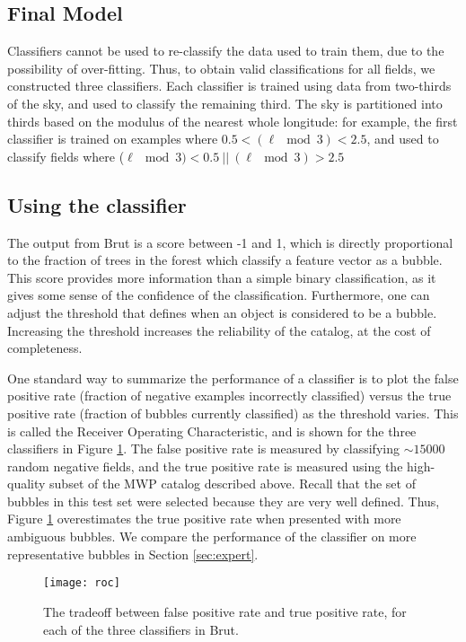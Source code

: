 \documentclass[preprint]{aastex}
\begin{document}
\subsection{Final Model}

Classifiers cannot be used to re-classify the data used to train them, due to the possibility of over-fitting. Thus, to obtain valid classifications for all fields, we constructed three classifiers. Each classifier is trained using data from two-thirds of the sky, and used to classify the remaining third. The sky is partitioned into thirds based on the modulus of the nearest whole longitude: for example, the first classifier is trained on examples where $0.5 < (\ell \mod{3})  < 2.5$, and used to classify fields where ($\ell \mod{3}) < 0.5 ~ || ~(\ell \mod{3}) > 2.5 $

\subsection{Using the classifier}

The output from Brut is a score between -1 and 1, which is directly proportional to the fraction of trees in the forest which classify a feature vector as a bubble. This score provides more information than a simple binary classification, as it gives some sense of the confidence of the classification. Furthermore, one can adjust the threshold that defines when an object is considered to be a bubble. Increasing the threshold increases the reliability of the catalog, at the cost of completeness.

One standard way to summarize the performance of a classifier is to plot the false positive rate (fraction of negative examples incorrectly classified) versus the true positive rate (fraction of bubbles currently classified) as the threshold varies. This is called the Receiver Operating Characteristic, and is shown for the three classifiers in Figure \ref{fig:roc}. The false positive rate is measured by classifying $\sim 15000$ random negative fields, and the true positive rate is measured using the high-quality subset of the MWP catalog described above. Recall that the set of bubbles in this test set were selected because they are very well defined. Thus, Figure \ref{fig:roc} overestimates the true positive rate when presented with more ambiguous bubbles. We compare the performance of the classifier on more representative bubbles in Section \ref{sec:expert}.

\begin{figure}[h!]
\texttt{[image: roc]}
\caption{The tradeoff between false positive rate and true positive rate, for each of the three classifiers in Brut.}
\label{fig:roc}
\end{figure}
\end{document}
